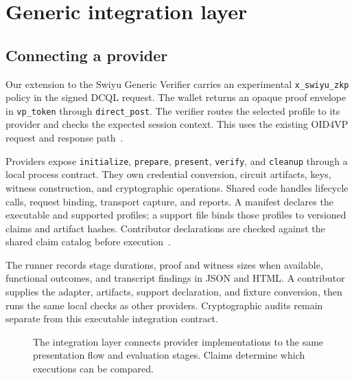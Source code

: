 \documentclass[10pt,twocolumn,letterpaper]{article}
\newcommand{\code}[1]{\texttt{#1}}
\begin{document}
\section{Generic integration layer}
\subsection{Connecting a provider}
Our extension to the Swiyu Generic Verifier carries an experimental \code{x\_swiyu\_zkp} policy in the signed DCQL request. The wallet returns an opaque proof envelope in \code{vp\_token} through \code{direct\_post}. The verifier routes the selected profile to its provider and checks the expected session context. This uses the existing OID4VP request and response path~\cite{oid4vp,swiyu,artifact}.

Providers expose \code{initialize}, \code{prepare}, \code{present}, \code{verify}, and \code{cleanup} through a local process contract. They own credential conversion, circuit artifacts, keys, witness construction, and cryptographic operations. Shared code handles lifecycle calls, request binding, transport capture, and reports. A manifest declares the executable and supported profiles; a support file binds those profiles to versioned claims and artifact hashes. Contributor declarations are checked against the shared claim catalog before execution~\cite{artifact}.

The runner records stage durations, proof and witness sizes when available, functional outcomes, and transcript findings in JSON and HTML. A contributor supplies the adapter, artifacts, support declaration, and fixture conversion, then runs the same local checks as other providers. Cryptographic audits remain separate from this executable integration contract.

\begin{figure}[t]
\centering
{}
\caption{The integration layer connects provider implementations to the same presentation flow and evaluation stages. Claims determine which executions can be compared.}
\label{fig:architecture}
\end{figure}
\end{document}
